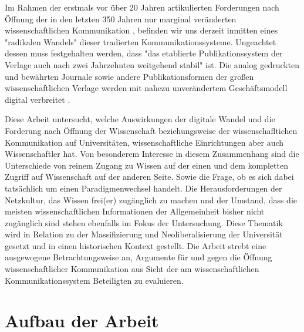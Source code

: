 Im Rahmen der erstmals vor über 20 Jahren artikulierten Forderungen nach Öffnung der in den letzten 350 Jahren nur marginal veränderten wissenschaftlichen Kommunikation \cite{poynder_2011_suber bzw suchen}, befinden wir uns derzeit inmitten eines "radikalen Wandels" \cite{poynder_2011_suber} dieser tradierten Kommunikationssysteme. Ungeachtet dessen muss festgehalten werden, dass "das etablierte Publikationssystem der Verlage auch nach zwei Jahrzehnten weitgehend stabil" \cite{Hanekop_2014} ist. Die analog gedruckten und bewährten Journale sowie andere Publikationsformen der großen wissenschaftlichen Verlage werden mit nahezu unverändertem Geschäftsmodell digital verbreitet \cite{Hanekop_2014} \cite{boai_2012}.

Diese Arbeit untersucht, welche Auswirkungen der digitale Wandel und die Forderung nach Öffnung der Wissenschaft beziehungsweise der wissenschafltichen Kommunikation auf Universitäten, wissenschaftliche Einrichtungen aber auch Wissenschaftler hat. Von besonderem Interesse in diesem Zusammenhang sind die Unterschiede von reinem Zugang zu Wissen auf der einen und dem kompletten Zugriff auf Wissenschaft auf der anderen Seite. Sowie die Frage, ob es sich dabei tatsächlich um einen Paradigmenwechsel handelt. Die Herausforderungen der Netzkultur, das Wissen frei(er) zugänglich zu machen und der Umstand, dass die meisten wissenschaftlichen Informationen der Allgemeinheit bisher nicht zugänglich sind \cite{cite:6} stehen ebenfalls im Fokus der Untersuchung. Diese Thematik wird in Relation zu der Massifizierung und Neoliberalisierung der Universität gesetzt und in einen historischen Kontext gestellt. Die Arbeit strebt eine ausgewogene Betrachtungsweise an, Argumente für und gegen die Öffnung wissenschaftlicher Kommunikation aus Sicht der am wissenschaftlichen Kommunikationssystem Beteiligten zu evaluieren.

\section{Aufbau der Arbeit} 

